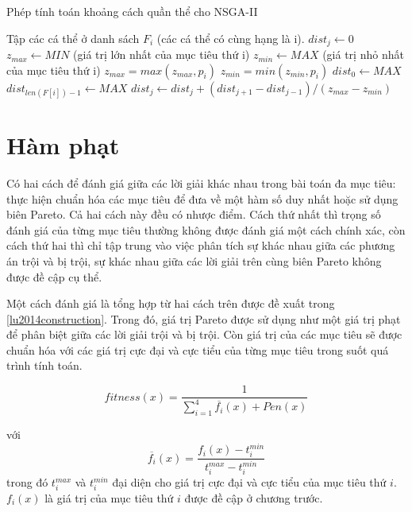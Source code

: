 \documentclass{hust}
\begin{document}
\begin{algorithm}[H]
	\caption{Phép tính toán khoảng cách quần thể cho \gls{NSGA-II}}
	\label{alg:crownding_distance}
	\begin{algorithmic}[1]
		\Require Tập các cá thể ở danh sách $F_i$ (các cá thể có cùng hạng là i).
			\State $dist_j \leftarrow 0$
		\EndFor
			\State $z_{max} \leftarrow MIN$ (giá trị lớn nhất của mục tiêu thứ i)
			\State $z_{min} \leftarrow MAX$ (giá trị nhỏ nhất của mục tiêu thứ i)
				\State $z_{max} = max(z_{max}, p_i)$
				\State $z_{min} = min(z_{min}, p_i)$
			\EndFor
			\State $dist_0 \leftarrow MAX$
			\State $dist_{len(F[i])-1} \leftarrow MAX$
				\State $dist_j \leftarrow dist_j + (dist_{j+1} - dist_{j-1})/(z_{max} - z_{min})$
			\EndFor
		\EndFor
	\end{algorithmic}
\end{algorithm}
\section{Hàm phạt}
Có hai cách để đánh giá giữa các lời giải khác nhau trong bài toán đa mục tiêu: thực hiện chuẩn hóa các mục tiêu để đưa về một hàm số duy nhất hoặc sử dụng biên Pareto. Cả hai cách này đều có nhược điểm. Cách thứ nhất thì trọng số đánh giá của từng mục tiêu thường không được đánh giá một cách chính xác, còn cách thứ hai thì chỉ tập trung vào việc phân tích sự khác nhau giữa các phương án trội và bị trội, sự khác nhau giữa các lời giải trên cùng biên Pareto không được đề cập cụ thể. 


Một cách đánh giá là tổng hợp từ hai cách trên được đề xuất trong \ref{lu2014construction}. Trong đó, giá trị Pareto được sử dụng như một giá trị phạt để phân biệt giữa các lời giải trội và bị trội. Còn giá trị của các mục tiêu sẽ được chuẩn hóa với các giá trị cực đại và cực tiểu của từng mục tiêu trong suốt quá trình tính toán.

\begin{equation}\label{eq:fitness}
fitness (x) = \frac{1}{\sum_{i=1}^4 \overline{f_i}(x) + Pen(x)}
\end{equation}

với
\begin{equation}\label{eq:newObjective}
\overline{f_i}(x) = \frac{f_i(x) - t^{min}_i}{t^{max}_i - t^{min}_i}
\end{equation}
trong đó $t^{max}_i$ và $t^{min}_i$ đại diện cho giá trị cực đại và cực tiểu của mục tiêu thứ $i$. $f_i(x)$ là giá trị của mục tiêu thứ $i$ được đề cập ở chương trước.
\end{document}
